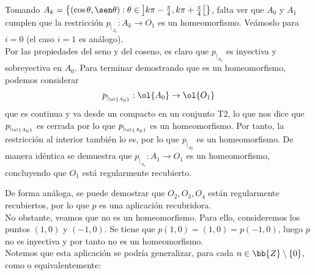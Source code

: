 \begin{ejemplo}
    Tomando $A_k = \left\{(\cos \theta, \sen \theta) : \theta \in \left]k\pi-\frac{\pi}{4}, k\pi+\frac{\pi}{4}\right[\right\}$, falta ver que $A_0$ y $A_1$ cumplen que la restricción $p_{|_{A_k}}:A_{k} \to O_1$ es un homeomorfismo. Veámoslo para $i=0$ (el caso $i=1$ es análogo).\\

    Por las propiedades del seno y del coseno, es claro que $p_{|_{A_0}}$ es inyectiva y sobreyectiva en $A_0$. Para terminar demostrando que es un homeomorfismo, podemos considerar 
    \begin{align*}
        p_{|_{\ol{A_0}}}:\ol{A_0}\to \ol{O_1}
    \end{align*}
    que es continua y va desde un compacto en un conjunto T2, lo que nos dice que $p_{|_{\ol{A_0}}}$ es cerrada por lo que $p_{|_{\ol{A_0}}}$ es un homeomorfismo. Por tanto, la restricción al interior
    también lo es, por lo que $p_{|_{A_0}}$ es un homeomorfismo. De manera idéntica se demuestra que $p_{|_{A_1}} : A_1 \to O_1$ es un homeomorfismo, concluyendo que $O_1$ está regularmente recubierto.

    De forma análoga, se puede demostrar que $O_2,O_3,O_4$ están regularmente recubiertos, por lo que $p$ es una aplicación recubridora.\\

    No obstante, veamos que no es un homeomorfismo. Para ello, consideremos los puntos $(1,0)$ y $(-1,0)$. Se tiene que $p(1,0) = (1,0) = p(-1,0)$, luego $p$ no es inyectiva y por tanto no es un homeomorfismo.\\
    

    Notemos que esta aplicación se podría generalizar, para cada $n\in \bb{Z}\setminus \{0\}$, como 
    o equivalentemente:
\end{ejemplo}

